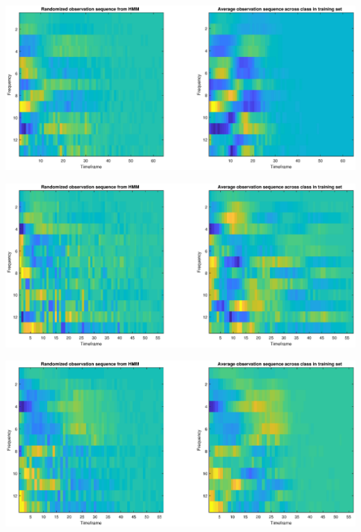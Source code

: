 \documentclass[]{article}
\let\origfigure\figure
\let\endorigfigure\endfigure
\renewenvironment{figure}[1][2] {
    \expandafter\origfigure\expandafter[H]
} {
    \endorigfigure
}
\begin{document}
\begin{figure}
\centering
\includegraphics{../Results/randCompClass5.eps}
\caption{Randomized vs training data class five}
\end{figure}

\begin{figure}
\centering
\includegraphics{../Results/randCompClass6.eps}
\caption{Randomized vs training data class six}
\end{figure}

\begin{figure}
\centering
\includegraphics{../Results/randCompClass7.eps}
\caption{Randomized vs training data class seven}
\end{figure}
\end{document}
